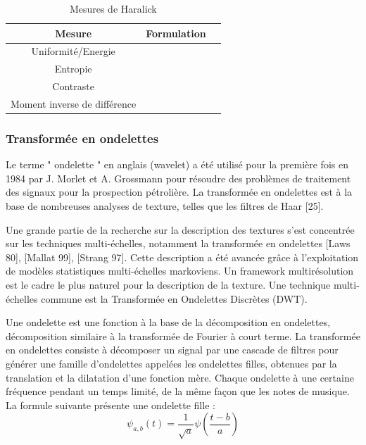 \begin{table}[H]
	\centering
	\begin{tabular}{|c|c|c|}
		
		\hline
		\textbf{ Mesure} & \textbf{  Formulation} \\
		\hline
		Uniformité/Energie & \makecell{$E = \sum_{i=0}^{n}\sum_{j=0}^{n} P_{d,\theta}(i, j) $ }    \\
		\hline
		Entropie & \makecell{$En = -\sum_{i=0}^{n}\sum_{j=0}^{n} P_{d,\theta}(i, j) \log_2 (P_{d,\theta}(i, j)) $}    \\
		\hline
		Contraste & \makecell{$ C = \sum_{i=0}^{n}\sum_{j=0}^{n} P_{d,\theta}(i, j) (i-j)^2 $} \\
		\hline
	Moment inverse de différence & \makecell{$ M = \frac{1}{1+(i-j)^2} \sum_{i=0}^{n}\sum_{j=0}^{n} P_{d,\theta}(i, j)  $}\\
	     \hline
	\end{tabular}
\caption{Mesures de Haralick}
\end{table}
 
 
\subsubsection{Transformée en ondelettes}
 Le terme " ondelette " en anglais (wavelet) a été utilisé pour la première fois en 1984 par J. Morlet et A. Grossmann pour résoudre des problèmes de traitement des signaux pour la prospection pétrolière. La transformée en ondelettes est à la base de nombreuses analyses de texture, telles que les filtres de Haar [25].

 
 Une grande partie de la recherche sur la description des textures s'est concentrée sur les techniques multi-échelles, notamment la transformée en ondelettes [Laws 80], [Mallat 99], [Strang 97]. Cette description a été avancée grâce à l'exploitation de modèles statistiques multi-échelles markoviens. Un framework multirésolution est le cadre le plus naturel pour la description de la texture. Une technique multi-échelles commune est la Transformée en Ondelettes Discrètes (DWT).
 
 Une ondelette est une fonction à la base de la décomposition en ondelettes, décomposition similaire à la transformée de Fourier à court terme. La transformée en ondelettes consiste à décomposer un signal par une cascade de filtres pour générer une famille d’ondelettes appelées les ondelettes filles, obtenues par la translation et la dilatation d’une fonction mère. Chaque ondelette à une certaine fréquence pendant un temps limité, de la même façon que les notes de musique. La formule suivante présente une ondelette fille :
\begin{equation}
	\psi_{a,b}(t) = \frac{1}{\sqrt{a}}\psi(\frac{t-b}{a})
\end{equation}
  

